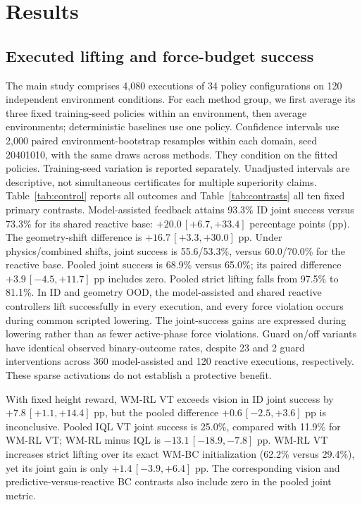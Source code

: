 \documentclass[letterpaper,10pt,conference]{ieeeconf}
\begin{document}
\section{Results}
\subsection{Executed lifting and force-budget success}
The main study comprises 4,080 executions of 34 policy configurations on
120 independent environment conditions. For each method group, we first
average its three fixed training-seed policies within an environment, then
average environments; deterministic baselines use one policy.
Confidence intervals use 2,000 paired environment-bootstrap resamples
within each domain, seed 20401010, with the same draws across methods.
They condition on the fitted policies. Training-seed variation is reported
separately. Unadjusted intervals are descriptive, not simultaneous
certificates for multiple superiority claims.
Table~\ref{tab:control} reports all outcomes and Table~\ref{tab:contrasts} all ten fixed primary contrasts. Model-assisted feedback attains 93.3\% ID joint success versus 73.3\% for its shared reactive base: \mbox{$+20.0\,[+6.7,+33.4]$} percentage points (pp). The geometry-shift difference is \mbox{$+16.7\,[+3.3,+30.0]$} pp. Under physics/combined shifts, joint success is 55.6/53.3\%, versus 60.0/70.0\% for the reactive base. Pooled joint success is 68.9\% versus 65.0\%; its paired difference \mbox{$+3.9\,[-4.5,+11.7]$} pp includes zero. Pooled strict lifting falls from 97.5\% to 81.1\%. In ID and geometry OOD, the model-assisted and shared reactive controllers lift successfully in every execution, and every force violation occurs during common scripted lowering. The joint-success gains are expressed during lowering rather than as fewer active-phase force violations. Guard on/off variants have identical observed binary-outcome rates, despite 23 and 2 guard interventions across 360 model-assisted and 120 reactive executions, respectively. These sparse activations do not establish a protective benefit.

With fixed height reward, WM-RL VT exceeds vision in ID joint success by \mbox{$+7.8\,[+1.1,+14.4]$} pp, but the pooled difference \mbox{$+0.6\,[-2.5,+3.6]$} pp is inconclusive. Pooled IQL VT joint success is 25.0\%, compared with 11.9\% for WM-RL VT; WM-RL minus IQL is \mbox{$-13.1\,[-18.9,-7.8]$} pp. WM-RL VT increases strict lifting over its exact WM-BC initialization (62.2\% versus 29.4\%), yet its joint gain is only \mbox{$+1.4\,[-3.9,+6.4]$} pp. The corresponding vision and predictive-versus-reactive BC contrasts also include zero in the pooled joint metric.
\end{document}
